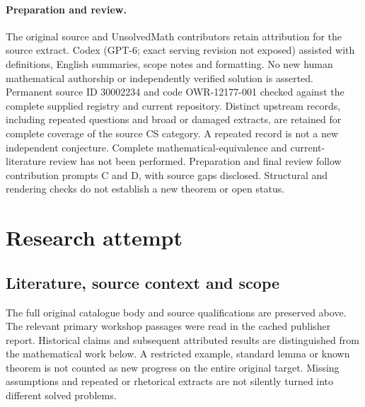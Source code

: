 \documentclass[11pt]{article}
\begin{document}
\paragraph{Preparation and review.}
The original source and UnsolvedMath contributors retain attribution for the source extract. Codex (GPT-6; exact serving revision not exposed) assisted with definitions, English summaries, scope notes and formatting. No new human mathematical authorship or independently verified solution is asserted. Permanent source ID 30002234 and code OWR-12177-001 checked against the complete supplied registry and current repository. Distinct upstream records, including repeated questions and broad or damaged extracts, are retained for complete coverage of the source CS category. A repeated record is not a new independent conjecture. Complete mathematical-equivalence and current-literature review has not been performed. Preparation and final review follow contribution prompts C and D, with source gaps disclosed. Structural and rendering checks do not establish a new theorem or open status.
\label{end:30002234}

\section{Research attempt}
\subsection{Literature, source context and scope}
The full original catalogue body and source qualifications are preserved above. The relevant primary workshop passages were read in the cached publisher report. Historical claims and subsequent attributed results are distinguished from the mathematical work below. A restricted example, standard lemma or known theorem is not counted as new progress on the entire original target. Missing assumptions and repeated or rhetorical extracts are not silently turned into different solved problems.
\end{document}
